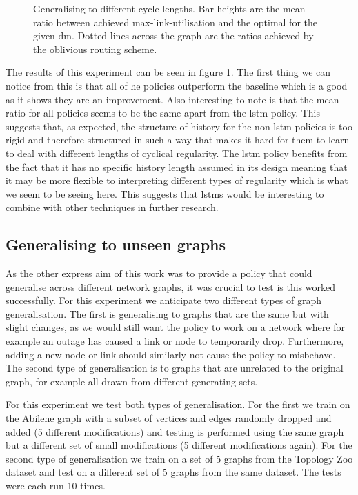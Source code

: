\begin{figure}
    \centering
    
    \caption{Generalising to different cycle lengths. Bar heights are the mean ratio between achieved max-link-utilisation and the optimal for the given \ac{dm}. Dotted lines across the graph are the ratios achieved by the oblivious routing scheme.}
    \label{fig:exp_vary}
\end{figure}

The results of this experiment can be seen in figure \ref{fig:exp_vary}. The first thing we can notice from this is that all of he policies outperform the baseline which is a good as it shows they are an improvement. Also interesting to note is that the mean ratio for all policies seems to be the same apart from the \ac{lstm} policy. This suggests that, as expected, the structure of history for the non-\ac{lstm} policies is too rigid and therefore structured in such a way that makes it hard for them to learn to deal with different lengths of cyclical regularity. The \ac{lstm} policy benefits from the fact that it has no specific history length assumed in its design meaning that it may be more flexible to interpreting different types of regularity which is what we seem to be seeing here. This suggests that \acp{lstm} would be interesting to combine with other techniques in further research.

\subsection{Generalising to unseen graphs}
As the other express aim of this work was to provide a policy that could generalise across different network graphs, it was crucial to test is this worked successfully. For this experiment we anticipate two different types of graph generalisation. The first is generalising to graphs that are the same but with slight changes, as we would still want the policy to work on a network where for example an outage has caused a link or node to temporarily drop. Furthermore, adding a new node or link should similarly not cause the policy to misbehave. The second type of generalisation is to graphs that are unrelated to the original graph, for example all drawn from different generating sets.

For this experiment we test both types of generalisation. For the first we train on the Abilene graph with a subset of vertices and edges randomly dropped and added (5 different modifications) and testing is performed using the same graph but a different set of small modifications (5 different modifications again). For the second type of generalisation we train on a set of 5 graphs from the Topology Zoo dataset and test on a different set of 5 graphs from the same dataset. The tests were each run 10 times.

